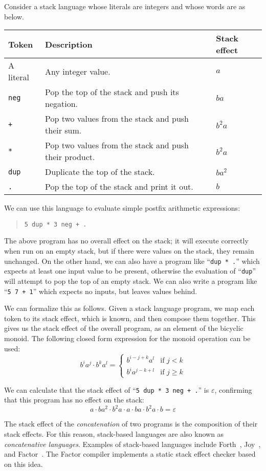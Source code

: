 \documentclass[../generics]{subfiles}
\begin{document}
\begin{example}
Consider a stack language whose literals are integers and whose words are as below.
\begin{center}
\begin{tabular}{lll}
\toprule
\textbf{Token}&\textbf{Description}&\textbf{Stack effect}\\
\midrule
A literal&Any integer value.&$a$\\
\texttt{neg}&Pop the top of the stack and push its negation.&$ba$\\
\texttt{+}&Pop two values from the stack and push their sum.&$b^2a$\\
\texttt{*}&Pop two values from the stack and push their product.&$b^2a$\\
\texttt{dup}&Duplicate the top of the stack.&$ba^2$\\
\texttt{.}&Pop the top of the stack and print it out.&$b$\\
\bottomrule
\end{tabular}
\end{center}

We can use this language to evaluate simple postfix arithmetic expressions:
\begin{quote}
\begin{verbatim}
5 dup * 3 neg + .
\end{verbatim}
\end{quote}
The above program has no overall effect on the stack; it will execute correctly when run on an empty stack, but if there were values on the stack, they remain unchanged. On the other hand, we can also have a program like ``\verb|dup * .|'' which expects at least one input value to be present, otherwise the evaluation of ``\texttt{dup}'' will attempt to pop the top of an empty stack. We can also write a program like ``\verb|5 7 + 1|'' which expects no inputs, but leaves values behind.

We can formalize this as follows. Given a stack language program, we map each token to its stack effect, which is known, and then compose them together. This gives us the stack effect of the overall program, as an element of the bicyclic monoid. The following closed form expression for the monoid operation can be used:
\[
b^i a^j \cdot b^k a^l = \begin{cases}
b^{i-j+k} a^l &\text{if $j<k$}\\
b^i a^{j-k+l} &\text{if $j\geq k$}
\end{cases}
\]

We can calculate that the stack effect of ``\verb|5 dup * 3 neg + .|'' is $\varepsilon$, confirming that this program has no effect on the stack:
\[a\cdot ba^2 \cdot b^2a \cdot a \cdot ba \cdot b^2a \cdot b = \varepsilon\]

The stack effect of the \emph{concatenation} of two programs is the composition of their stack effects. For this reason, stack-based languages are also known as \emph{concatenative languages}. Examples of stack-based languages include Forth~\cite{forth}, Joy~\cite{joy}, and Factor~\cite{factor}. The Factor compiler implements a static stack effect checker based on this idea.
\end{example}
\end{document}
